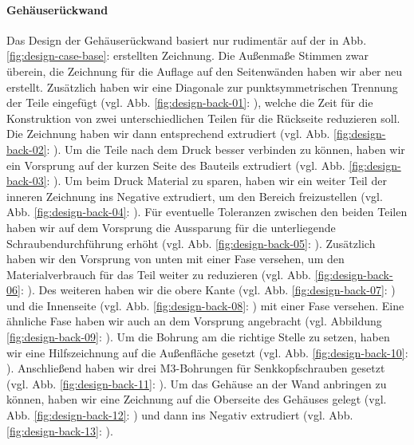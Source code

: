 \paragraph{Gehäuserückwand}
Das Design der Gehäuserückwand basiert nur rudimentär auf der in Abb. \ref{fig:design-case-base}:  erstellten Zeichnung. 
Die Außenmaße Stimmen zwar überein, die Zeichnung für die Auflage auf den Seitenwänden haben wir aber neu erstellt. Zusätzlich haben wir eine Diagonale zur punktsymmetrischen Trennung der Teile eingefügt (vgl. Abb. \ref{fig:design-back-01}: ), welche die Zeit für die Konstruktion von zwei unterschiedlichen Teilen für die Rückseite reduzieren soll. 
Die Zeichnung haben wir dann entsprechend extrudiert (vgl. Abb. \ref{fig:design-back-02}: ). Um die Teile nach dem Druck besser verbinden zu können, haben wir ein Vorsprung auf der kurzen Seite des Bauteils extrudiert (vgl. Abb. \ref{fig:design-back-03}: ). 
Um beim Druck Material zu sparen, haben wir ein weiter Teil der inneren Zeichnung ins Negative extrudiert, um den Bereich freizustellen (vgl. Abb. \ref{fig:design-back-04}: ). 
Für eventuelle Toleranzen zwischen den beiden Teilen haben wir auf dem Vorsprung die Aussparung für die unterliegende Schraubendurchführung erhöht (vgl. Abb. \ref{fig:design-back-05}: ). 
Zusätzlich haben wir den Vorsprung von unten mit einer Fase versehen, um den Materialverbrauch für das Teil weiter zu reduzieren (vgl. Abb. \ref{fig:design-back-06}: ). 
Des weiteren haben wir die obere Kante (vgl. Abb. \ref{fig:design-back-07}: ) und die Innenseite (vgl. Abb. \ref{fig:design-back-08}: ) mit einer Fase versehen. 
Eine ähnliche Fase haben wir auch an dem Vorsprung angebracht (vgl. Abbildung \ref{fig:design-back-09}: ). 
Um die Bohrung am die richtige Stelle zu setzen, haben wir eine Hilfszeichnung auf die Außenfläche gesetzt (vgl. Abb. \ref{fig:design-back-10}: ). 
Anschließend haben wir drei M3-Bohrungen für Senkkopfschrauben gesetzt (vgl. Abb. \ref{fig:design-back-11}: ). 
Um das Gehäuse an der Wand anbringen zu können, haben wir eine Zeichnung auf die Oberseite des Gehäuses gelegt (vgl. Abb. \ref{fig:design-back-12}: ) und dann ins Negativ extrudiert (vgl. Abb. \ref{fig:design-back-13}: ). 
